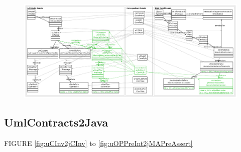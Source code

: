 \documentclass[tuberlin,cic,tc,english,noabntcite]{iiufrgs}
\begin{document}
\begin{figure}[h]
    \caption{}
    \begin{center}
        \includegraphics[width=40em]{uMessageSequence2jInteractionAnnotation_2}
    \end{center}
    \label{fig:uMessageSequence2jInteractionAnnotation_2}
\end{figure}


\subsection{UmlContracts2Java}
FIGURE \ref{fig:uCInv2jCInv} to \ref{fig:uOPPreInt2jMAPreAssert}
\end{document}

